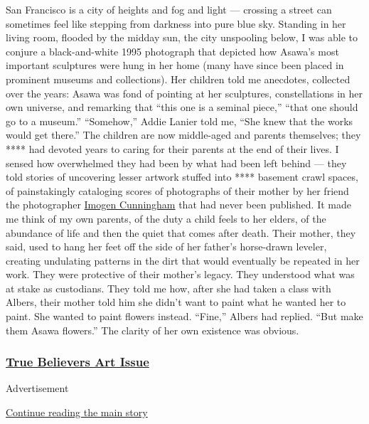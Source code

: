 San Francisco is a city of heights and fog and light --- crossing a
street can sometimes feel like stepping from darkness into pure blue
sky. Standing in her living room, flooded by the midday sun, the city
unspooling below, I was able to conjure a black-and-white 1995
photograph that depicted how Asawa's most important sculptures were hung
in her home (many have since been placed in prominent museums and
collections). Her children told me anecdotes, collected over the years:
Asawa was fond of pointing at her sculptures, constellations in her own
universe, and remarking that ``this one is a seminal piece,'' ``that one
should go to a museum.'' ``Somehow,'' Addie Lanier told me, ``She knew
that the works would get there.'' The children are now middle-aged and
parents themselves; they **** had devoted years to caring for their
parents at the end of their lives. I sensed how overwhelmed they had
been by what had been left behind --- they told stories of uncovering
lesser artwork stuffed into **** basement crawl spaces, of painstakingly
cataloging scores of photographs of their mother by her friend the
photographer
\href{https://www.nytimes3xbfgragh.onion/1973/05/06/archives/imogen-cunningham-at-ninety-a-remarkable-empathy.html}{Imogen
Cunningham} that had never been published. It made me think of my own
parents, of the duty a child feels to her elders, of the abundance of
life and then the quiet that comes after death. Their mother, they said,
used to hang her feet off the side of her father's horse-drawn leveler,
creating undulating patterns in the dirt that would eventually be
repeated in her work. They were protective of their mother's legacy.
They understood what was at stake as custodians. They told me how, after
she had taken a class with Albers, their mother told him she didn't want
to paint what he wanted her to paint. She wanted to paint flowers
instead. ``Fine,'' Albers had replied. ``But make them Asawa flowers.''
The clarity of her own existence was obvious.

\hypertarget{true-believers-art-issue}{%
\subsubsection{\texorpdfstring{\href{https://www.nytimes3xbfgragh.onion/issue/t-magazine/2020/07/02/true-believers-art-issue}{True
Believers Art
Issue}}{True Believers Art Issue}}\label{true-believers-art-issue}}

Advertisement

\protect\hyperlink{after-bottom}{Continue reading the main story}

